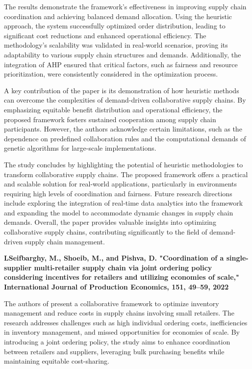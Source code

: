 The results demonstrate the framework's effectiveness in improving supply chain coordination and achieving balanced demand allocation. Using the heuristic approach, the system successfully optimized order distribution, leading to significant cost reductions and enhanced operational efficiency. The methodology’s scalability was validated in real-world scenarios, proving its adaptability to various supply chain structures and demands. Additionally, the integration of AHP ensured that critical factors, such as fairness and resource prioritization, were consistently considered in the optimization process.

A key contribution of the paper is its demonstration of how heuristic methods can overcome the complexities of demand-driven collaborative supply chains. By emphasizing equitable benefit distribution and operational efficiency, the proposed framework fosters sustained cooperation among supply chain participants. However, the authors acknowledge certain limitations, such as the dependence on predefined collaboration rules and the computational demands of genetic algorithms for large-scale implementations.

The study concludes by highlighting the potential of heuristic methodologies to transform collaborative supply chains. The proposed framework offers a practical and scalable solution for real-world applications, particularly in environments requiring high levels of coordination and fairness. Future research directions include exploring the integration of real-time data analytics into the framework and expanding the model to accommodate dynamic changes in supply chain demands. Overall, the paper provides valuable insights into optimizing collaborative supply chains, contributing significantly to the field of demand-driven supply chain management.


\textbf{\cite{seifbarghy2022coordination}LSeifbarghy, M., Shoeib, M., and Pishva, D. "Coordination of a single-supplier multi-retailer supply chain via joint ordering policy considering incentives for retailers and utilizing economies of scale," International Journal of Production Economics, 151, 49–59, 2022}

The authors of present a collaborative framework to optimize inventory management and reduce costs in supply chains involving small retailers. The research addresses challenges such as high individual ordering costs, inefficiencies in inventory management, and missed opportunities for economies of scale. By introducing a joint ordering policy, the study aims to enhance coordination between retailers and suppliers, leveraging bulk purchasing benefits while maintaining equitable cost-sharing.


